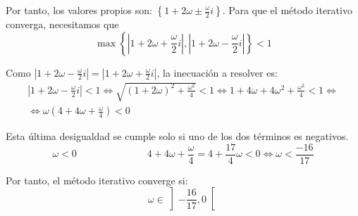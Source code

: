 \documentclass[12pt]{article}
\begin{document}
\begin{ejercicio}
\begin{enumerate}
        Por tanto, los valores propios son: $\left\{1 + 2\omega \pm \frac{\omega}{2}i\right\}$. Para que el método iterativo converga, necesitamos que
        $$\max \left\{\left|1 + 2\omega + \frac{\omega}{2}i\right| ,\left| 1 + 2\omega - \frac{\omega}{2}i\right| \right\} < 1$$

        Como $\left| 1 + 2\omega - \frac{\omega}{2}i\right| = \left| 1 + 2\omega + \frac{\omega}{2}i\right|$, la inecuación a resolver es:
        \begin{multline*}
            \left| 1 + 2\omega - \frac{\omega}{2}i\right| < 1 \Longleftrightarrow \sqrt{(1+2\omega)^2 + \frac{\omega^2}{4}} < 1 \Longleftrightarrow 1 + 4\omega + 4\omega^2 + \frac{\omega^2}{4} < 1 
            \Longleftrightarrow \\ \Longleftrightarrow
            \omega\left(4 + 4\omega + \frac{\omega}{4}\right) < 0
        \end{multline*}

        Esta última desigualdad se cumple solo si uno de los dos términos es negativos.
        \begin{equation*}
            \omega < 0 \hspace{3cm} 4 + 4\omega + \frac{\omega}{4} = 4 + \frac{17}{4}\omega < 0 \Longleftrightarrow \omega < \frac{-16}{17}
        \end{equation*}

        Por tanto, el método iterativo converge si: $$\omega \in \left]-\frac{16}{17},0\right[$$
    \end{enumerate}
\end{ejercicio}
\end{document}
